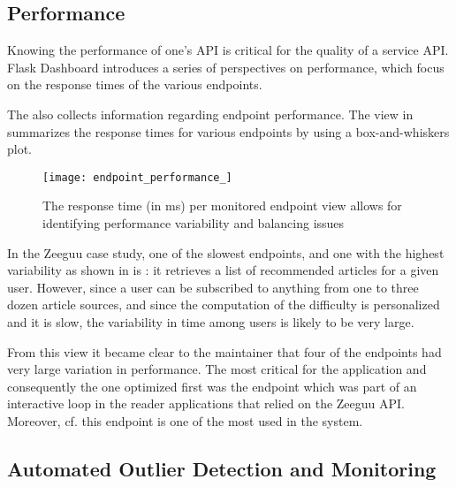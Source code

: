
\newpage
\subsection{Performance}
\label{sec:perf}

Knowing the performance of one’s API is critical for the quality of a service API. Flask Dashboard introduces a series of perspectives on performance, which focus on the response times of the various endpoints.





The \tool also collects information regarding endpoint performance. The view in  summarizes the response times for various endpoints by using a box-and-whiskers plot. 


 \begin{figure}[!ht]
   \centering
   \texttt{[image: endpoint\_performance\_]}
   \caption{The response time (in ms) per monitored endpoint view allows for identifying performance variability and balancing issues}
   \label{fig:ep}
 \end{figure}



In the Zeeguu case study, one of the slowest endpoints, and one with the highest variability as shown in  is \epFeedItems: it retrieves a list of recommended articles for a given user. However, since a user can be subscribed to anything from one to three dozen article sources, and since the computation of the difficulty is personalized and it is slow, the variability in time among users is likely to be very large. 

From this view it became clear to the maintainer that four of the endpoints had very large variation in performance.   The most critical for the application and consequently the one optimized first was the \epTranslations endpoint which was part of an interactive loop in the reader applications that relied on the Zeeguu API. Moreover, cf.  this endpoint is one of the most used in the system.



  \subsection{Automated Outlier Detection and Monitoring}
  
